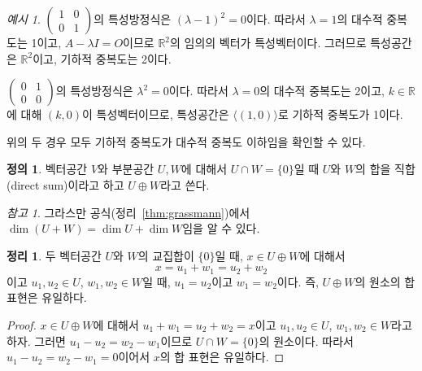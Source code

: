 \documentclass[unfonts,oneside,a4paper]{oblivoir}
\theoremstyle{definition}
\newtheorem{definition}{정의}[section]
\theoremstyle{theorem}
\newtheorem{theorem}{정리}[section]
\theoremstyle{theorem}
\theoremstyle{remark}
\newtheorem*{remark}{참고}
\theoremstyle{remark}
\theoremstyle{remark}
\newtheorem*{example}{예시}
\theoremstyle{remark}
\renewcommand{\vec}[1]{\bm{\mathit{#1}}}
\newcommand{\vecz}{\bm{\mathrm{0}}}
\begin{document}
\begin{example}
    $\begin{pmatrix}1 & 0\\0 & 1\end{pmatrix}$의 특성방정식은 $(\lambda - 1)^2 = 0$이다.
    따라서 $\lambda = 1$의 대수적 중복도는 1이고, $A - \lambda I = O$이므로 $\mathbb R^2$의 임의의 벡터가 특성벡터이다.
    그러므로 특성공간은 $\mathbb R^2$이고, 기하적 중복도는 2이다.

    $\begin{pmatrix}0 & 1\\0 & 0\end{pmatrix}$의 특성방정식은 $\lambda^2 = 0$이다.
    따라서 $\lambda = 0$의 대수적 중복도는 2이고, $k \in \mathbb R$에 대해 $(k, 0)$이 특성벡터이므로, 특성공간은 $\langle (1, 0) \rangle$로 기하적 중복도가 1이다.

    위의 두 경우 모두 기하적 중복도가 대수적 중복도 이하임을 확인할 수 있다.
\end{example}

\begin{definition}
    벡터공간 $V$와 부분공간 $U, W$에 대해서 $U \cap W = \{\vecz\}$일 때 $U$와 $W$의 합을 직합(direct sum)이라고 하고 $U \oplus W$라고 쓴다.
\end{definition}

\begin{remark}
    그라스만 공식(정리~\ref{thm:grassmann})에서 $\dim (U + W) = \dim U + \dim W$임을 알 수 있다.
\end{remark}

\begin{theorem}
    두 벡터공간 $U$와 $W$의 교집합이 $\{\vecz\}$일 때, $\vec x \in U \oplus W$에 대해서
    \begin{equation*}
        \vec x = \vec u_1 + \vec w_1 = \vec u_2 + \vec w_2
    \end{equation*}
    이고 $\vec u_1, \vec u_2 \in U$, $\vec w_1, \vec w_2 \in W$일 때, $\vec u_1 = \vec u_2$이고 $\vec w_1 = \vec w_2$이다.
    즉, $U \oplus W$의 원소의 합 표현은 유일하다.
\end{theorem}

\begin{proof}
    $\vec x \in U \oplus W$에 대해서 $\vec u_1 + \vec w_1 = \vec u_2 + \vec w_2 = \vec x$이고 $\vec u_1, \vec u_2 \in U$, $\vec w_1, \vec w_2 \in W$라고 하자.
    그러면 $\vec u_1 - \vec u_2 = \vec w_2 - \vec w_1$이므로 $U \cap W = \{\vecz\}$의 원소이다.
    따라서 $\vec u_1 - \vec u_2 = \vec w_2 - \vec w_1 = \vecz$이어서 $\vec x$의 합 표현은 유일하다.
\end{proof}
\end{document}
